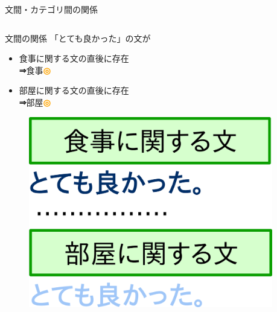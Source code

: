 \documentclass[aspectratio=43,unicode,10pt]{beamer}
\newcommand{\then}{\textcolor{ttiblue}{\textbf{⇒}}\hspace{1ex}}
\newcommand{\good}{\textcolor{orange}{\textbf{◎}}\hspace{1ex}}
\begin{document}
\begin{frame}{文間・カテゴリ間の関係}{}
  \begin{columns}[t]
    \begin{column}{0.6\textwidth}
      \begin{block}{文間の関係}
        「とても良かった」の文が
        \begin{itemize}
          \item 食事に関する文の直後に存在 \\
                \then 食事\good
          \item 部屋に関する文の直後に存在 \\
                \then 部屋\good
        \end{itemize}
        \begin{figure}
          \includegraphics[width=0.6\linewidth]
                          {fig/global_relations_among_sentences_v2.png}
        \end{figure}
      \end{block}
    \end{column}
    \begin{column}{0.4\textwidth}
\end{column}
\end{columns}
\end{frame}
\end{document}
